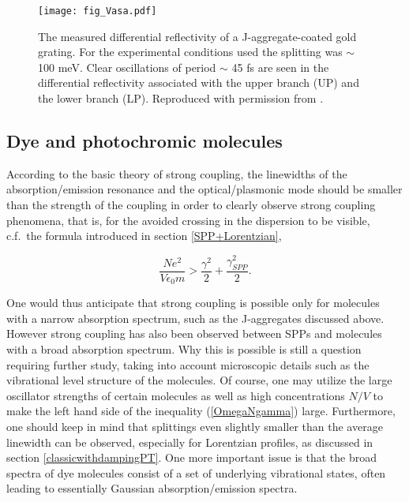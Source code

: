 \documentclass[12pt]{iopart}
\begin{document}
\begin{figure}
\texttt{[image: fig\_Vasa.pdf]}
\caption{The measured differential reflectivity of a J-aggregate-coated gold grating. For the experimental conditions used the splitting was $\sim$ 100 meV. Clear oscillations of period $\sim$ 45 fs are seen in the differential reflectivity associated with the upper branch (UP) and the lower branch (LP). Reproduced with permission from \cite{Vasa2013}.} 
\label{fig_Vasa}
\end{figure}



\subsection{Dye and photochromic molecules}   \label{DyePT}

According to the basic theory of strong coupling, the linewidths of the absorption/emission resonance and the 
optical/plasmonic mode should be smaller than the strength of the coupling in order to clearly
observe strong coupling phenomena, that is, for the avoided crossing in the dispersion to be visible, 
c.f.\ the formula introduced in section \ref{SPP+Lorentzian},

\begin{equation}
\frac{Ne^2}{V \epsilon_0 m}>\frac{\gamma^2}{2}+\frac{\gamma_{SPP}^2}{2}  .  \label{OmegaNgamma}
\end{equation}

\noindent One would thus anticipate that strong coupling is possible only for molecules with a narrow absorption spectrum, 
such as the J-aggregates discussed above. However strong coupling has also been observed between SPPs and molecules with a 
broad absorption spectrum. Why this is possible is still a question requiring further  study, taking into account 
microscopic details such as the vibrational level structure of the molecules. Of course, one may utilize the large
oscillator strengths of certain molecules as well as high concentrations $N/V$ to make the left hand side of the
inequality (\ref{OmegaNgamma}) large. Furthermore, one should keep in mind that splittings even slightly smaller than the
average linewidth can be observed, especially for Lorentzian profiles, as discussed in section \ref{classicwithdampingPT}. One more important issue is that the broad spectra of dye molecules consist of 
a set of underlying vibrational states, often leading to essentially Gaussian absorption/emission spectra. 
\end{document}
